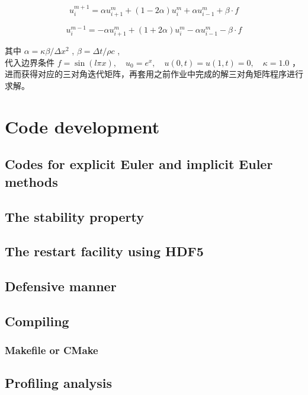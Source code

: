 \documentclass[3p]{elsarticle}
\numberwithin{equation}{section}
\begin{document}
	\begin{equation}
		u_{i}^{m+1}=\alpha u_{i+1}^{m}+(1-2 \alpha) u_{i}^{m}+\alpha u_{i-1}^{m} + \beta \cdot f
	\end{equation}

	\begin{equation}
	    u_{i}^{m-1} = -\alpha u_{i+1}^{m}+(1+2 \alpha) u_{i}^{m}-\alpha u_{i-1}^{m} - \beta \cdot f
	\end{equation}

    其中 $ \alpha =  \kappa \beta / \Delta x^{2} $ , $ \beta = \Delta t / \rho c  $ , \\ 代入边界条件 $f = \sin (l \pi x), \quad u_{0} = e^{x}, \quad u(0, t) = u(1, t) = 0, \quad \kappa = 1.0$ ，进而获得对应的三对角迭代矩阵，再套用之前作业中完成的解三对角矩阵程序进行求解。
    
    \section{Code development}
    
    \subsection{Codes for explicit Euler and implicit Euler methods}
    
    \subsection{The stability property}
    
    \subsection{The restart facility using HDF5}
    
    \subsection{Defensive manner}
    
    \subsection{Compiling}
    
    \subsubsection{Makefile or CMake}
    
    \subsection{Profiling analysis}
    
\end{document}
